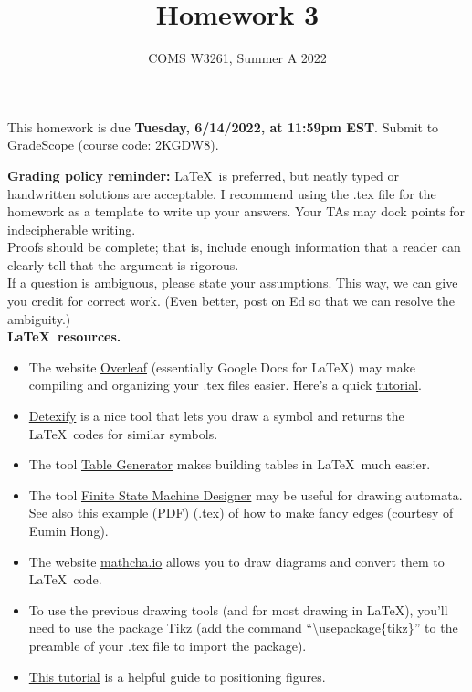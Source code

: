 \documentclass[letterpaper,11pt,twoside]{article}
\title{Homework 3}
\date{COMS W3261, Summer A 2022}
\theoremstyle{plain}
\theoremstyle{definition}
\theoremstyle{remark}
\theoremstyle{restate}
\begin{document}
\maketitle

This homework is due \textbf{Tuesday, 6/14/2022, at 11:59pm EST}. Submit to GradeScope (course code: 2KGDW8).

\textbf{Grading policy reminder:} \LaTeX~is preferred, but neatly typed or handwritten solutions are acceptable. I recommend using the .tex file for the homework as a template to write up your answers. Your TAs may dock points for indecipherable writing.\\

Proofs should be complete; that is, include enough information that a reader can clearly tell that the argument is rigorous. \\

If a question is ambiguous, please state your assumptions. This way, we can give you credit for correct work. (Even better, post on Ed so that we can resolve the ambiguity.) \\

\textbf{\LaTeX~resources.}
\begin{itemize}
    \item The website \href{https://www.overleaf.com/}{Overleaf} (essentially Google Docs for LaTeX) may make compiling and organizing your .tex files easier. Here's a quick \href{https://www.overleaf.com/learn/latex/Learn_LaTeX_in_30_minutes}{tutorial}.
    \item \href{https://detexify.kirelabs.org/classify.html}{Detexify} is a nice tool that lets you draw a symbol and returns the \LaTeX~codes for similar symbols. 
    \item The tool \href{https://www.tablesgenerator.com/}{Table Generator} makes building tables in \LaTeX~much easier.
    \item The tool \href{http://madebyevan.com/fsm/}{Finite State Machine Designer} may be useful for drawing automata. See also this example (\href{https://static.us.edusercontent.com/files/HZeTXimODzWeLvHIqsvjL2BG}{PDF}) (\href{https://static.us.edusercontent.com/files/RI3W8tQNvHMWFe9MkXV1KztA}{.tex}) of how to make fancy edges (courtesy of Eumin Hong).
    \item The website \href{https://www.mathcha.io/}{mathcha.io} allows you to draw diagrams and convert them to \LaTeX~code.
    \item To use the previous drawing tools (and for most drawing in \LaTeX), you'll need to use the package Tikz (add the command ``\textbackslash usepackage\{tikz\}'' to the preamble of your .tex file to import the package). 
    \item \href{https://www.overleaf.com/learn/latex/Positioning_of_Figures}{This tutorial} is a helpful guide to positioning figures.
\end{itemize}  
\end{document}
